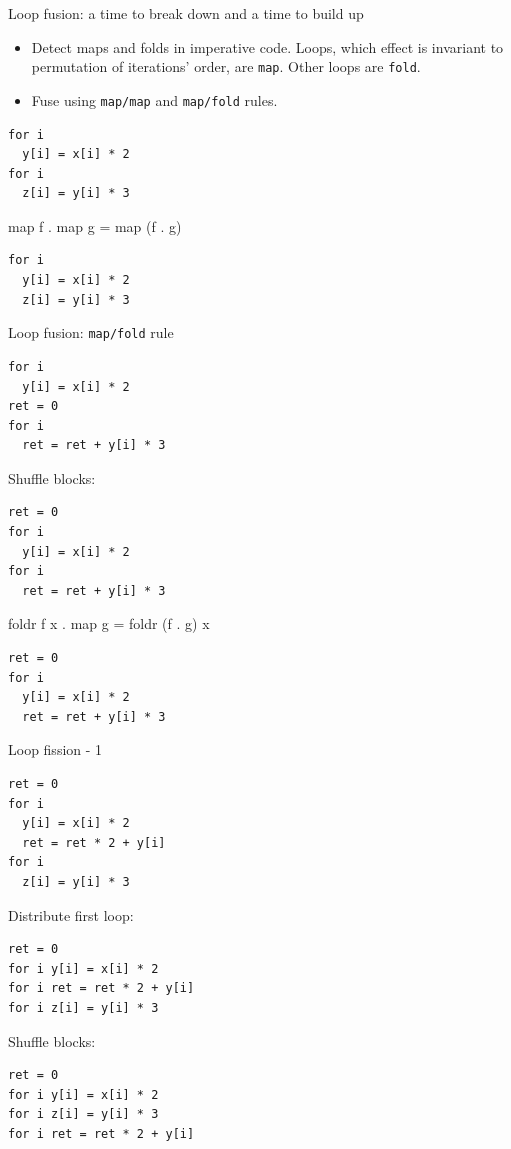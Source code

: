 \documentclass[handout]{beamer}
\begin{document}
\begin{frame}[fragile]{Loop fusion: a time to break down and a time to build up}

\begin{itemize}

\item Detect maps and folds in imperative code. Loops, which effect is invariant to permutation of iterations' order, are {\tt map}. Other loops are {\tt fold}.

\item Fuse using {\tt map/map} and {\tt map/fold} rules.
\end{itemize}

\begin{lstlisting}
for i
  y[i] = x[i] * 2
for i
  z[i] = y[i] * 3
\end{lstlisting}

\centerline{map f . map g = map (f . g)}

\begin{lstlisting}
for i
  y[i] = x[i] * 2
  z[i] = y[i] * 3
\end{lstlisting}

\end{frame}

\begin{frame}[fragile]{Loop fusion: {\tt map/fold} rule}

\begin{lstlisting}
for i
  y[i] = x[i] * 2
ret = 0
for i
  ret = ret + y[i] * 3
\end{lstlisting}

Shuffle blocks:

\begin{lstlisting}
ret = 0
for i
  y[i] = x[i] * 2
for i
  ret = ret + y[i] * 3
\end{lstlisting}

\centerline{foldr f x . map g = foldr (f . g) x}

\begin{lstlisting}
ret = 0
for i
  y[i] = x[i] * 2
  ret = ret + y[i] * 3
\end{lstlisting}

\end{frame}

\begin{frame}[fragile]{Loop fission - 1}

\begin{lstlisting}
ret = 0
for i
  y[i] = x[i] * 2
  ret = ret * 2 + y[i]
for i
  z[i] = y[i] * 3
\end{lstlisting}

Distribute first loop:

\begin{lstlisting}
ret = 0
for i y[i] = x[i] * 2
for i ret = ret * 2 + y[i]
for i z[i] = y[i] * 3
\end{lstlisting}

Shuffle blocks:

\begin{lstlisting}
ret = 0
for i y[i] = x[i] * 2
for i z[i] = y[i] * 3
for i ret = ret * 2 + y[i]
\end{lstlisting}

\end{frame}
\end{document}
